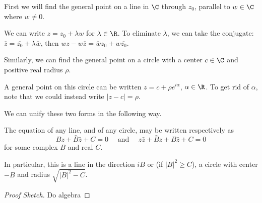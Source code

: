 First we will find the general point on a line
in $\C$ through $z_0$, parallel to $w \in \C$ where $w \neq 0$.
\begin{center}
\end{center}
We can write $z = z_0 + \lambda w$ for $\lambda \in \R$. To eliminate $\lambda$, we can take the conjugate: $\overline{z} = \overline{z_0} + \lambda \overline{w}$, then $wz - w\overline{z} = \overline{w} z_0 + w \overline{z_0}$.

Similarly, we can find the general point on a circle with a center $c \in \C$ and positive real radius $\rho$.

\begin{center}
\end{center}
A general point on this circle can be written $z = c + \rho e^{i \alpha}$, $\alpha \in \R$. To get rid of $\alpha$, note that we could instead write $|z - c| = \rho$.

We can unify these two forms in the following way.

\begin{proposition}
	The equation of any line, and of any circle, may be written respectively as
$$
B z+\bar{B} \bar{z}+C=0 \quad \text { and } \quad z \bar{z}+\bar{B} z+B \bar{z}+C=0
$$
for some complex $B$ and real $C$.

In particular, this is a line in the direction $iB$ or (if $|B|^2 \geq C$), a circle with center $-B$ and radius $\sqrt{|B|^2 - C}$.
\end{proposition}
\begin{proof}[Proof Sketch]
	Do algebra
\end{proof}
